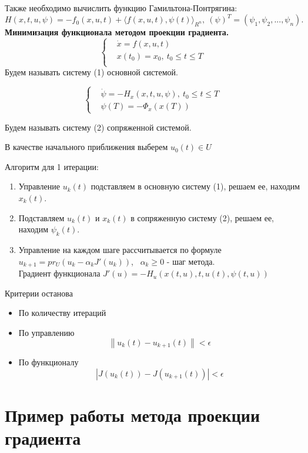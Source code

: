 \documentclass[oneside,final,12pt]{extreport}
\begin{document}
\noindent Также необходимо вычислить функцию Гамильтона-Понтрягина:
$$H(x,t,u,\psi)=-f_0(x,u,t)+\langle f(x,u,t),\psi(t)\rangle_{R^{n}}, \ (\psi)^T=(\psi_1, \psi_2,...,\psi_n).$$
\newpage
\textbf{Минимизация функционала методом проекции градиента.}
\begin{equation}
\left \{\begin{aligned}
& \dot{x} = f(x,u,t)\\
& x(t_0)=x_0, \ t_0 \leqslant t \leqslant T\\
\end{aligned} \right. 
\end{equation}
Будем называть систему (1) основной системой.

\begin{equation}
\left \{
\begin{aligned}
& \dot{\psi} = -H_x(x,t,u,\psi),\ t_0 \leqslant t \leqslant T \\
& \psi(T) = -\Phi_x(x(T))
\end{aligned} \right.
\end{equation}

Будем называть систему (2) сопряженной системой.

В качестве начального приближения выберем $u_0(t) \in U$

Алгоритм для 1 итерации:
\begin{enumerate}
\item Управление $u_k(t)$ подставляем в основную систему (1), решаем ее, находим $x_k(t)$.
\item Подставляем $u_k(t)$ и $x_k(t)$ в сопряженную систему (2), решаем ее, находим $\psi_k(t)$.
\item Управление на каждом шаге рассчитывается по формуле $u_{k+1}=pr_U(u_k-\alpha_kJ'(u_k))$, \ $\alpha_k \geqslant 0$ - шаг метода.\\ Градиент функционала $J'(u)=-H_u(x(t,u),t,u(t),\psi(t,u))$

\end{enumerate}
Критерии останова
\begin{itemize}
\item По количеству итераций
\item По управлению
$$\left \|u_k(t)-u_{k+1}(t)\right \| < \epsilon$$
\item По функционалу
$$\left |J(u_k(t))-J(u_{k+1}(t))\right | < \epsilon$$
\end{itemize}

\section{Пример работы метода проекции градиента}
 
\end{document}
